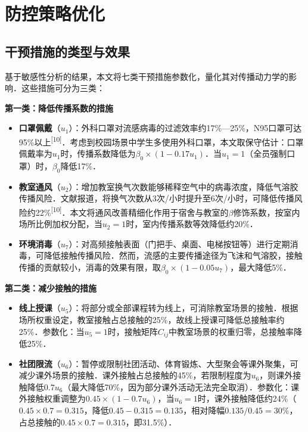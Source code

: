 \section{防控策略优化}

\subsection{干预措施的类型与效果}

基于敏感性分析的结果，本文将七类干预措施参数化，量化其对传播动力学的影响．这些措施可分为三类：

\textbf{第一类：降低传播系数的措施}

\begin{itemize}
  \item \textbf{口罩佩戴}（$u_1$）：外科口罩对流感病毒的过滤效率约17\%—25\%，N95口罩可达95\%以上\textsuperscript{[10]}．考虑到校园场景中学生多使用外科口罩，本文取保守估计：口罩佩戴率为$u_1$时，传播系数降低为$\beta_0 \times (1 - 0.17 u_1)$．当$u_1 = 1$（全员强制口罩）时，$\beta_0$降低17\%．
  
  \item \textbf{教室通风}（$u_2$）：增加教室换气次数能够稀释空气中的病毒浓度，降低气溶胶传播风险．文献报道，将换气次数从3次/小时提升至6次/小时，可降低传播风险约22\%\textsuperscript{[10]}．本文将通风改善精细化作用于宿舍与教室的$\beta$修饰系数，按室内场所比例加权分配，当$u_2 = 1$时，室内传播系数等效降低约20\%．
  
  \item \textbf{环境消毒}（$u_7$）：对高频接触表面（门把手、桌面、电梯按钮等）进行定期消毒，可降低接触传播风险．然而，流感的主要传播途径为飞沫和气溶胶，接触传播的贡献较小，消毒的效果有限，取$\beta_0 \times (1 - 0.05 u_7)$，最大降低5\%．
\end{itemize}

\textbf{第二类：减少接触的措施}

\begin{itemize}
  \item \textbf{线上授课}（$u_5$）：将部分或全部课程转为线上，可消除教室场景的接触．根据场所权重设定，教室接触占总接触的25\%，故线上授课可降低总接触率约25\%．参数化：当$u_5 = 1$时，接触矩阵$C_{ij}$中教室场景的权重归零，总接触率降低25\%．
  
  \item \textbf{社团限流}（$u_6$）：暂停或限制社团活动、体育锻炼、大型聚会等课外聚集，可减少课外场景的接触．课外接触占总接触的45\%，若限制程度为$u_6$，则课外接触降低$0.7 u_6$（最大降低70\%，因为部分课外活动无法完全取消）．参数化：课外接触权重调整为$0.45 \times (1 - 0.7 u_6)$，当$u_6 = 1$时，课外接触降低约24\%（$0.45 \times 0.7 = 0.315$，降低$0.45 - 0.315 = 0.135$，相对降幅$0.135/0.45 = 30\%$，占总接触的$0.45 \times 0.7 = 0.315$，即31.5\%）．
\end{itemize}

